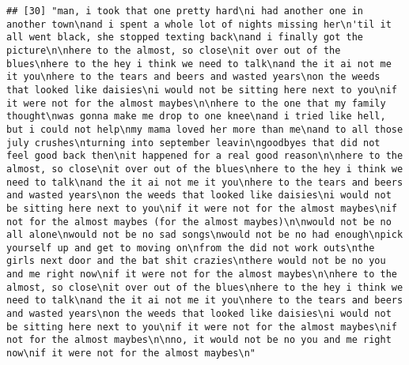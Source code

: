 \documentclass[]{article}
\begin{document}
\begin{verbatim}
## [30] "man, i took that one pretty hard\ni had another one in another town\nand i spent a whole lot of nights missing her\n'til it all went black, she stopped texting back\nand i finally got the picture\n\nhere to the almost, so close\nit over out of the blues\nhere to the hey i think we need to talk\nand the it ai not me it you\nhere to the tears and beers and wasted years\non the weeds that looked like daisies\ni would not be sitting here next to you\nif it were not for the almost maybes\n\nhere to the one that my family thought\nwas gonna make me drop to one knee\nand i tried like hell, but i could not help\nmy mama loved her more than me\nand to all those july crushes\nturning into september leavin\ngoodbyes that did not feel good back then\nit happened for a real good reason\n\nhere to the almost, so close\nit over out of the blues\nhere to the hey i think we need to talk\nand the it ai not me it you\nhere to the tears and beers and wasted years\non the weeds that looked like daisies\ni would not be sitting here next to you\nif it were not for the almost maybes\nif not for the almost maybes (for the almost maybes)\n\nwould not be no all alone\nwould not be no sad songs\nwould not be no had enough\npick yourself up and get to moving on\nfrom the did not work outs\nthe girls next door and the bat shit crazies\nthere would not be no you and me right now\nif it were not for the almost maybes\n\nhere to the almost, so close\nit over out of the blues\nhere to the hey i think we need to talk\nand the it ai not me it you\nhere to the tears and beers and wasted years\non the weeds that looked like daisies\ni would not be sitting here next to you\nif it were not for the almost maybes\nif not for the almost maybes\n\nno, it would not be no you and me right now\nif it were not for the almost maybes\n"                                                                                                                                                                                                                                                                                                                                                                                                                                                                                                                                                                                                                                                                                                                                                                                                                                                                                                                                                                                                                                                                                        

\end{verbatim}
\end{document}

